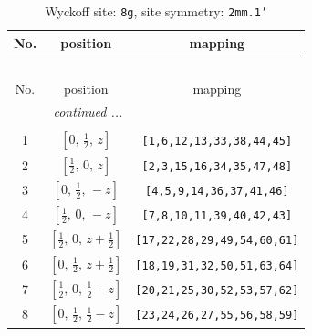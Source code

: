 \documentclass[fleqn,8pt]{jsarticle}
\begin{document}
\begin{longtable}{ccc}
\caption{Wyckoff site: {\tt 8g}, site symmetry: {\tt 2mm.1'}}
 \\
 \hline \hline
No. & position & mapping \\ \hline \endfirsthead

\multicolumn{2}{l}{\tablename\ \thetable{}} \\
 \hline \hline
No. & position & mapping \\ \hline \endhead

 \hline \hline
\multicolumn{2}{r}{\footnotesize\it continued ...} \\ \endfoot

 \hline \hline
\multicolumn{2}{r}{} \\ \endlastfoot

1 & $\left[ 0,\, \frac{1}{2},\, z \right]$ & {\tt [1,6,12,13,33,38,44,45]} \\ \hline
2 & $\left[ \frac{1}{2},\, 0,\, z \right]$ & {\tt [2,3,15,16,34,35,47,48]} \\ \hline
3 & $\left[ 0,\, \frac{1}{2},\, - z \right]$ & {\tt [4,5,9,14,36,37,41,46]} \\ \hline
4 & $\left[ \frac{1}{2},\, 0,\, - z \right]$ & {\tt [7,8,10,11,39,40,42,43]} \\ \hline
5 & $\left[ \frac{1}{2},\, 0,\, z + \frac{1}{2} \right]$ & {\tt [17,22,28,29,49,54,60,61]} \\ \hline
6 & $\left[ 0,\, \frac{1}{2},\, z + \frac{1}{2} \right]$ & {\tt [18,19,31,32,50,51,63,64]} \\ \hline
7 & $\left[ \frac{1}{2},\, 0,\, \frac{1}{2} - z \right]$ & {\tt [20,21,25,30,52,53,57,62]} \\ \hline
8 & $\left[ 0,\, \frac{1}{2},\, \frac{1}{2} - z \right]$ & {\tt [23,24,26,27,55,56,58,59]} \\
\end{longtable}
\renewcommand{\arraystretch}{1.2}
\end{document}
